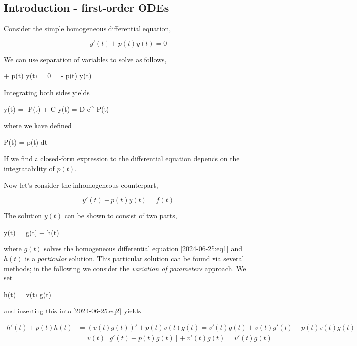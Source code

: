 
\subsection{Introduction - first-order ODEs}

Consider the simple homogeneous differential equation,

\begin{equation}\label{2024-06-25:eq1}
y'(t) + p(t) y(t) = 0
\end{equation}

We can use separation of variables to solve as follows,

\bee
{} + p(t) y(t) = 0 \rightarrow {} = - p(t) y(t)
\eee

Integrating both sides yields

\bee
\ln y(t) = -P(t) + C \rightarrow y(t) = D e^{-P(t)}
\eee

where we have defined 

\bee
P(t) = \int p(t) dt
\eee

If we find a closed-form expression to the differential equation depends on the integratability of $p(t)$.

Now let's consider the inhomogeneous counterpart,

\begin{equation}\label{2024-06-25:eq2}
y'(t) + p(t) y(t) = f(t)
\end{equation}

The solution $y(t)$ can be shown to consist of two parts,

\bee
y(t) = g(t) + h(t)
\eee

where $g(t)$ solves the homogeneous differential equation \eqref{2024-06-25:eq1} and $h(t)$ is a \emph{particular} solution. This particular solution can be found via several methods; in the following we consider the \emph{variation of parameters} approach. We set

\bee
h(t) = v(t) g(t)
\eee

and inserting this into \eqref{2024-06-25:eq2} yields

\begin{align*}
h'(t) + p(t) h(t) &= \left( v(t)g(t)\right)' + p(t) v(t) g(t) = v'(t) g(t) + v(t) g'(t) + p(t) v(t) g(t) \\
                  &= v(t) \left[ g'(t) + p(t) g(t) \right] + v'(t) g(t) = v'(t) g(t)
\end{align*}

